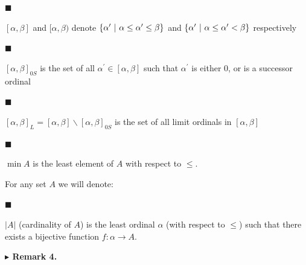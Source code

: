  
 
\par\noindent  $\blacksquare$ 
 
$[\alpha,\beta]$ and $[\alpha,\beta)$ denote $\{\alpha^{\prime}\leavevmode\nobreak\ |\leavevmode\nobreak\ \alpha\leq\alpha^{%
\prime}\leq\beta\}$ and $\{\alpha^{\prime}\leavevmode\nobreak\ |\leavevmode\nobreak\ \alpha\leq\alpha^{%
\prime}<\beta\}$ respectively\par
 
 
 
\par\noindent  $\blacksquare$ 
 
$[\alpha,\beta]_{0S}$ is the set of all $\alpha^{\prime}\in[\alpha,\beta]$ such that $\alpha^{\prime}$ is either 0, or is a successor ordinal\par
 
 
 
\par\noindent  $\blacksquare$ 
 
$[\alpha,\beta]_{L}=[\alpha,\beta]\backslash[\alpha,\beta]_{0S}$ is the set of all limit ordinals in $[\alpha,\beta]$\par
 
 
 
\par\noindent  $\blacksquare$ 
 
$\min A$ is the least element of $A$ with respect to $\leq$.\par
 
 
  
 
 
For any set $A$ we will denote:\par
  
\par\noindent  $\blacksquare$ 
 
$|A|$ (cardinality of $A$) is the least ordinal $\alpha$ (with respect to $\leq$) such that there exists a bijective function $f:\alpha\to A$.\par
 
 
  
 
 
\par\medskip\noindent\textbf{$\blacktriangleright$ Remark 4.}\par
 
